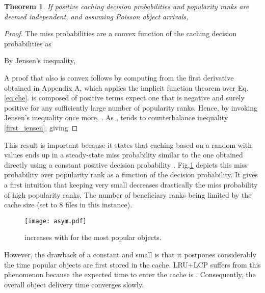 \documentclass[conference]{IEEEtran}
\newtheorem{theorem}{Theorem}
\begin{document}
\begin{theorem}
\label{theo:pi_asym_LRU}
If positive caching decision probabilities  and 
popularity ranks are deemed independent, and assuming Poisson 
object arrivals,


\label{jensen_asym}
\end{theorem}

\begin{proof}
The miss probabilities are a convex function of the caching 
decision probabilities as

By Jensen's inequality,

A proof that also  is convex  follows by 
computing 
 from the first derivative obtained 
in \cite{DBLP:journals/corr/MartinaGL13} Appendix A, which applies the implicit function 
theorem over  Eq.\eqref{eq:che}. 
 is composed of positive terms expect one 
 that is negative  and 
surely positive for any sufficiently large number of 
popularity ranks. Hence, by invoking Jensen's inequality once more,  .
As ,  tends to counterbalance inequality 
\eqref{first_jensen}, giving


\end{proof}

This result is important because it states that caching based on a random  with values  ends up in a steady-state miss probability similar to the one obtained directly using a constant positive decision probability .
Fig.\ref{fig:asym} depicts this miss probability over popularity rank as a function of the decision probability. It gives a first intuition that keeping  very small decreases drastically the miss probability of high popularity ranks. The number of beneficiary ranks being limited by the cache size (set to 8 files in this instance).
\begin{figure}[!ht]
\centering
\texttt{[image: asym.pdf]}
\caption{ increases with  for the most popular objects.} 
\label{fig:asym} 
\end{figure}
However, the drawback of a constant and small  
is that it postpones considerably the time popular objects 
are first stored in the cache. LRU+LCP suffers from this 
phenomenon because the expected time to enter the cache is
. Consequently, the overall 
object delivery time converges slowly.
\end{document}
